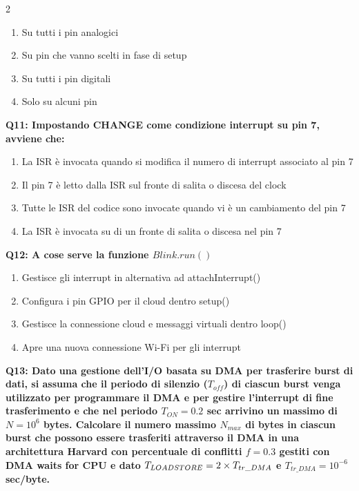 \documentclass[10pt]{article}
\begin{document}
\begin{multicols}{2}
\begin{enumerate}[label=\arabic*.]
\item Su tutti i pin analogici
\item Su pin che vanno scelti in fase di setup
\item Su tutti i pin digitali
\item Solo su alcuni pin
\end{enumerate}
\textbf{Q11: Impostando CHANGE come condizione interrupt su pin 7, avviene che:}

\begin{enumerate}[label=\arabic*.]
\item La ISR è invocata quando si modifica il numero di interrupt associato al pin 7
\item Il pin 7 è letto dalla ISR sul fronte di salita o discesa del clock
\item Tutte le ISR del codice sono invocate quando vi è un cambiamento del pin 7
\item La ISR è invocata su di un fronte di salita o discesa nel pin 7
\end{enumerate}
\textbf{Q12: A cose serve la funzione $Blink.run()$}

\begin{enumerate}[label=\arabic*.]
\item Gestisce gli interrupt in alternativa ad attachInterrupt()
\item Configura i pin GPIO per il cloud dentro setup()
\item Gestisce la connessione cloud e messaggi virtuali dentro loop()
\item Apre una nuova connessione Wi-Fi per gli interrupt
\end{enumerate}
\textbf{Q13: Dato una gestione dell’I/O basata su DMA per trasferire burst di dati, si assuma che il periodo di silenzio  ($T_{off}$) di ciascun burst venga utilizzato per programmare il DMA e per gestire l’interrupt di fine trasferimento e che nel periodo $T_{ON} = 0.2$ sec arrivino un massimo di $N=10^6$ bytes. Calcolare il numero massimo $N_{max}$ di bytes in ciascun burst che possono essere trasferiti attraverso il DMA in una architettura Harvard con percentuale di conflitti $f = 0.3$ gestiti con DMA waits for CPU e dato $T_{LOAD\/STORE} = 2 \times T_{tr\_DMA}$ e $T_{tr\_DMA} = 10^{-6}$ sec/byte.}


\end{multicols}
\end{document}
